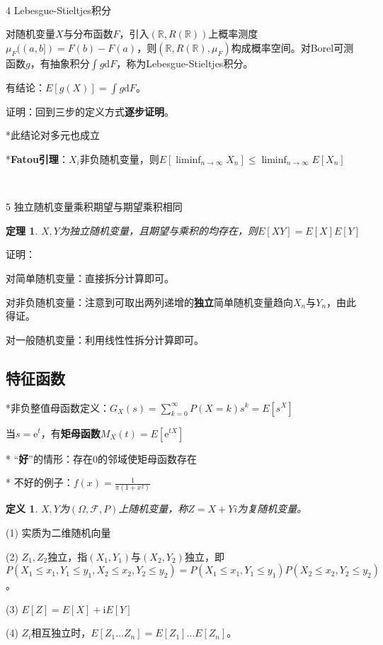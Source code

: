 \documentclass[a4paper,UTF8,fontset=windows]{ctexart}
\newtheorem{thm}{定理}[section]
\newtheorem{defi}{定义}[section]
\begin{document}
~

4 Lebesgue-Stieltjes积分

对随机变量$X$与分布函数$F$，引入$(\mathbb{R},R(\mathbb{R}))$上概率测度$\mu_F((a,b])=F(b)-F(a)$，则$(\mathbb{R},R(\mathbb{R}),\mu_F)$构成概率空间。对Borel可测函数$g$，有抽象积分$\int g\mathrm{d}F$，称为Lebesgue-Stieltjes积分。

有结论：$E[g(X)]=\int g\mathrm{d}F$。

证明：回到三步的定义方式\textbf{逐步证明}。

*此结论对多元也成立

*\textbf{Fatou引理}：$X_i$非负随机变量，则$E[\liminf_{n\to\infty}X_n]\le\liminf_{n\to\infty}E[X_n]$

~

5 独立随机变量乘积期望与期望乘积相同

\begin{thm} $X,Y$为独立随机变量，且期望与乘积的均存在，则$E[XY]=E[X]E[Y]$
\end{thm}

证明：

对简单随机变量：直接拆分计算即可。

对非负随机变量：注意到可取出两列递增的\textbf{独立}简单随机变量趋向$X_n$与$Y_n$，由此得证。

对一般随机变量：利用线性性拆分计算即可。

\subsection{特征函数}
*非负整值母函数定义：$G_X(s)=\sum_{k=0}^\infty P(X=k)s^k=E[s^X]$

当$s=\mathrm{e}^t$，有\textbf{矩母函数}$M_X(t)=E[\mathrm{e}^{tX}]$

* “\textbf{好}”的情形：存在0的邻域使矩母函数存在

* 不好的例子：$f(x)=\frac{1}{\pi(1+x^2)}$

\begin{defi}
$X,Y$为$(\Omega,\mathcal{F},P)$上随机变量，称$Z=X+Yi$为复随机变量。
\end{defi}

(1) 实质为二维随机向量

(2) $Z_1,Z_2$独立，指$(X_1,Y_1)$与$(X_2,Y_2)$独立，即$P(X_1\le x_1,Y_1\le y_1,X_2\le x_2,Y_2\le y_2)=P(X_1\le x_1,Y_1\le y_1)P(X_2\le x_2,Y_2\le y_2)$。

(3) $E[Z]=E[X]+\mathrm{i}E[Y]$

(4) $Z_i$相互独立时，$E[Z_1\dots Z_n]=E[Z_1]\dots E[Z_n]$。
\end{document}
